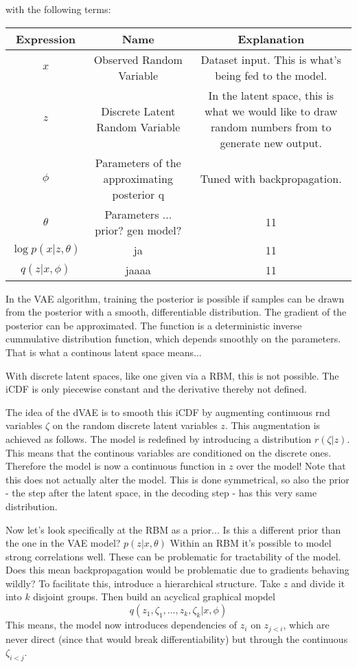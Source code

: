 with the following terms:
\begin{table}
  \begin{tabular}{c|c|c}
    Expression & Name & Explanation\\\hline
    $x$ & Observed Random Variable & Dataset input. This is what's being fed to
    the model.\\
    $z$ & Discrete Latent Random Variable & In the latent space, this is what we
    would like to draw random numbers from to generate new output.\\
    $\phi$ & Parameters of the approximating posterior q & Tuned with
    backpropagation.\\
    $\theta$ & Parameters ... prior? gen model? & 11\\
    $\log{p(x|z,\theta)}$ & ja & 11\\
    $q(z|x,\phi)$ & jaaaa & 11\\
   \end{tabular}   
\end{table}

In the VAE algorithm, training the posterior is possible if samples can be drawn
from the posterior with a smooth, differentiable distribution. The gradient of
the posterior can be approximated. The function is a deterministic inverse
cummulative distribution function, which depends smoothly on the parameters.
That is what a continous latent space means...

With discrete latent spaces, like one given via a RBM, %
this is not possible. The iCDF is only piecewise constant and the derivative
thereby not defined.

The idea of the dVAE is to smooth this iCDF by augmenting continuous rnd
variables $\zeta$ on the random discrete latent variables $z$. This augmentation
is achieved as follows. The model is redefined by introducing a distribution
$r(\zeta|z)$. This means that the continous variables are conditioned on the
discrete ones. Therefore the model is now a continuous function in $z$ over the
model! Note that this does not actually alter the model. %
This is done symmetrical, so also the prior - the step after the latent space,
in the decoding step - has this very same distribution.

Now let's look specifically at the RBM as a prior... Is this a different prior
than the one in the VAE model? $p(z|x,\theta)$ %
Within an RBM it's possible to model strong correlations well. %
These can be problematic for tractability of the model. Does this mean
backpropagation would be problematic due to gradients behaving wildly? To
facilitate this, introduce a hierarchical structure. Take $z$ and divide it into
$k$ disjoint groups. Then build an acyclical graphical mopdel 
\[
q(z_1,\zeta_1,...,z_k,\zeta_k|x,\phi)  
\]
This means, the model now introduces dependencies of $z_i$ on $z_{j<i}$, which
are never direct (since that would break differentiability) but through the
continuous $\zeta_{i<j}$.

